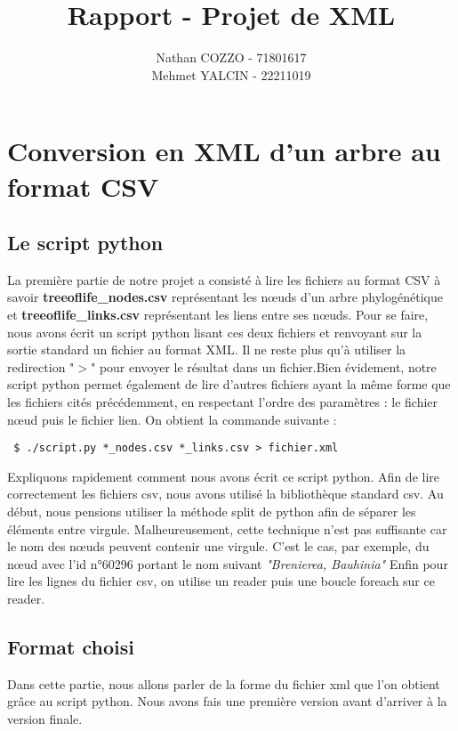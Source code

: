 \documentclass{article}
\title{Rapport - Projet de XML}
\author{Nathan COZZO - 71801617 \\ Mehmet YALCIN - 22211019}
\begin{document}
\maketitle
\newpage
\tableofcontents
\newpage

\section{Conversion en XML d'un arbre au format CSV}
\subsection{Le script python}
La première partie de notre projet a consisté à lire les fichiers au format CSV à savoir \textbf{treeoflife\_nodes.csv} représentant les nœuds d'un arbre phylogénétique et \textbf{treeoflife\_links.csv} représentant les liens entre ses nœuds. Pour se faire, nous avons écrit un script python lisant ces deux fichiers et renvoyant sur la sortie standard un fichier au format XML. Il ne reste plus qu'à utiliser la redirection "$>$" pour envoyer le résultat dans un fichier.Bien évidement, notre script python permet également de lire d'autres fichiers ayant la même forme que les fichiers cités précédemment, en respectant l'ordre des paramètres : le fichier nœud puis le fichier lien. On obtient la commande suivante :
\begin{lstlisting}
 $ ./script.py *_nodes.csv *_links.csv > fichier.xml
\end{lstlisting}

Expliquons rapidement comment nous avons écrit ce script python.
Afin de lire correctement les fichiers csv, nous avons utilisé la bibliothèque standard csv. Au début, nous pensions utiliser la méthode split de python afin de séparer les éléments entre virgule. Malheureusement, cette technique n'est pas suffisante car le nom des nœuds peuvent contenir une virgule. 
C'est le cas, par exemple, du nœud avec l'id n°60296 portant le nom suivant \textit{"Brenierea, Bauhinia"}
Enfin pour lire les lignes du fichier csv, on utilise un reader puis une boucle foreach sur ce reader.

\subsection{Format choisi}
Dans cette partie, nous allons parler de la forme du fichier xml que l'on obtient grâce au script python. Nous avons fais une première version avant d'arriver à la version finale.
\end{document}
